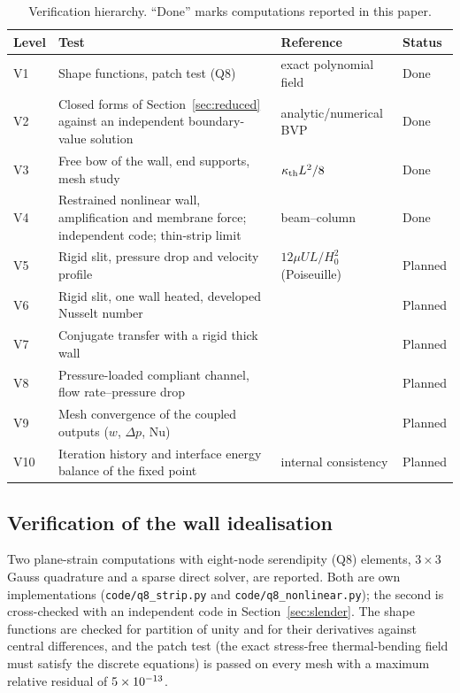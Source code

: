 \begin{table}[t]
\centering\small
\caption{Verification hierarchy. ``Done'' marks computations reported in this paper.}
\label{tab:hier}
\begin{tabular}{@{}p{0.8cm}p{6.4cm}p{4.6cm}p{1.3cm}@{}}
\toprule
Level & Test & Reference & Status \\
\midrule
V1 & Shape functions, patch test (Q8) & exact polynomial field & Done \\
V2 & Closed forms of Section~\ref{sec:reduced} against an independent boundary-value solution & analytic/numerical BVP & Done \\
V3 & Free bow of the wall, end supports, mesh study & $\kappa_{\mathrm{th}} L^2/8$ & Done \\
V4 & Restrained nonlinear wall, amplification and membrane force; independent code; thin-strip limit & beam--column & Done \\
V5 & Rigid slit, pressure drop and velocity profile & $12\mu UL/H_0^2$ (Poiseuille) & Planned \\
V6 & Rigid slit, one wall heated, developed Nusselt number & \citet{shah1978laminar} & Planned \\
V7 & Conjugate transfer with a rigid thick wall & \citet{rahimi2024conjugate} & Planned \\
V8 & Pressure-loaded compliant channel, flow rate--pressure drop & \citet{christov2018flow} & Planned \\
V9 & Mesh convergence of the coupled outputs ($w$, $\Delta p$, $\mathrm{Nu}$) & \citet{celik2008procedure} & Planned \\
V10 & Iteration history and interface energy balance of the fixed point & internal consistency & Planned \\
\bottomrule
\end{tabular}
\end{table}

\subsection{Verification of the wall idealisation}
\label{sec:q8}
Two plane-strain computations with eight-node serendipity (Q8) elements, $3\times3$ Gauss quadrature and
a sparse direct solver, are reported. Both are own implementations (\texttt{code/q8\_strip.py} and
\texttt{code/q8\_nonlinear.py}); the second is cross-checked with an independent code in Section~\ref{sec:slender}. The shape functions are checked for partition of unity and for their
derivatives against central differences, and the patch test (the exact stress-free thermal-bending field must
satisfy the discrete equations) is passed on every mesh with a maximum relative residual of
$5\times10^{-13}$.

